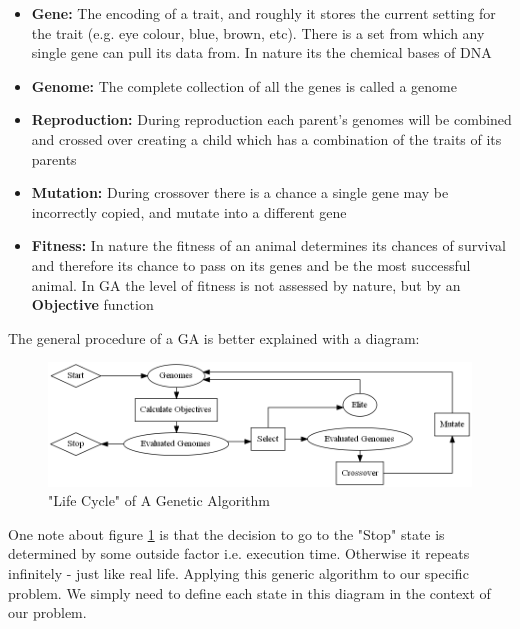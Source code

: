 \documentclass[11pt]{article}
\begin{document}
    \begin{itemize}
        \item{\textbf{Gene:} The encoding of a trait, and roughly it stores the current
            setting for the trait (e.g. eye colour, blue, brown, etc). There is a set
            from which any single gene can pull its data from. In nature its the chemical
            bases  of DNA}
        \item{\textbf{Genome:} The complete collection of all the genes is called a
            genome}
        \item{\textbf{Reproduction:} During reproduction each parent's genomes will be
            combined and crossed over creating a child which has a combination of
            the traits of its parents}
        \item{\textbf{Mutation:} During crossover there is a chance a single gene
            may be incorrectly copied, and mutate into a different gene}
        \item{\textbf{Fitness: } In nature the fitness of an animal determines
            its chances of survival and therefore its chance to pass on its genes
            and be the most successful animal. In GA the level of fitness is not assessed
            by nature, but by an \textbf{Objective} function}
    \end{itemize}

    The general procedure of a GA is better explained with a diagram:

    \begin{figure}[h] %
        \centering
        \includegraphics[width=\textwidth]{GA}
        \caption{"Life Cycle" of A Genetic Algorithm}\label{fig:GA}
    \end{figure}

    One note about figure \ref{fig:GA} is that the decision to go to the "Stop"
    state is determined by some outside factor i.e. execution time. Otherwise
    it repeats infinitely - just like real life. Applying this generic algorithm to 
    our specific problem. We simply need to
    define each state in this diagram in the context of our problem.
\end{document}
